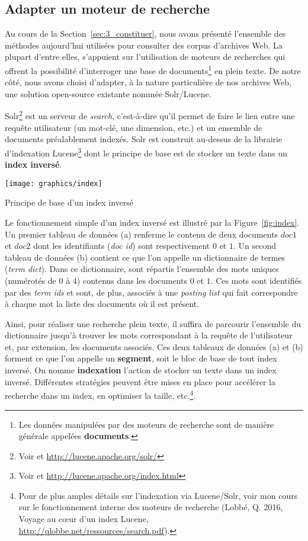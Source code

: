 \documentclass[symmetric,justified,marginals=raggedouter]{tufte-book}
\begin{document}
\subsection{Adapter un moteur de recherche}

\noindent Au cours de la Section~\ref{sec:3_constituer}, nous avons présenté l'ensemble des méthodes aujourd'hui utilisées pour consulter des corpus d'archives Web. La plupart d'entre elles, s'appuient sur l'utilisation de moteurs de recherches qui offrent la possibilité d'interroger une base de documents\footnote{\RaggedOuter Les données manipulées par des moteurs de recherche sont de manière générale appelées \textbf{documents}.} en plein texte. De notre côté, nous avons choisi d'adapter, à la nature particulière de nos archives Web, une solution open-source existante nommée Solr/Lucene. 

Solr\footnote{\RaggedOuter Voir \citep{grainger_solr_2014} et \url{http://lucene.apache.org/solr/}} est un serveur de \textit{search}, c'est-à-dire qu'il permet de faire le lien entre une requête utilisateur (un mot-clé, une dimension, etc.) et un ensemble de documents préalablement indexés. Solr est construit au-dessus de la librairie d'indexation Lucene\footnote{\RaggedOuter Voir \citep{hatcher_lucene_2004} et \url{http://lucene.apache.org/index.html}} dont le principe de base est de stocker un texte dans un \textbf{index inversé}.

\begin{marginfigure}%
  \texttt{[image: graphics/index]}
  \vspace*{0.2cm}  
  \caption{Principe de base d'un index inversé}
  \label{fig:index}
\end{marginfigure} 


Le fonctionnement simple d'un index inversé est illustré par la Figure~\ref{fig:index}. Un premier tableau de données (a) renferme le contenu de deux documents $doc 1$ et $doc 2$ dont les identifiants (\textit{doc id}) sont respectivement $0$ et $1$. Un second tableau de données (b) contient ce que l'on appelle un dictionnaire de termes (\textit{term dict}). Dans ce dictionnaire, sont répartis l'ensemble des mots uniques (numérotés de $0$ à $4$) contenus dans les documents $0$ et $1$. Ces mots sont identifiés par des \textit{term ids} et sont, de plus, associés à une \textit{posting list} qui fait correspondre à chaque mot la liste des documents où il est présent. 

Ainsi, pour réaliser une recherche plein texte, il suffira de parcourir l'ensemble du dictionnaire jusqu'à trouver les mots correspondant à la requête de l'utilisateur et, par extension, les documents associés. Ces deux tableaux de données (a) et (b) forment ce que l'on appelle un \textbf{segment}, soit le bloc de base de tout index inversé. On nomme \textbf{indexation} l'action de stocker un texte dans un index inversé. Différentes stratégies peuvent être mises en place pour accélérer la recherche dans un index, en optimiser la taille, etc.\footnote{\RaggedOuter Pour de plus amples détails sur l'indexation via Lucene/Solr, voir mon cours sur le fonctionnement interne des moteurs de recherche (Lobbé, Q. 2016, Voyage au cœur d'un index Lucene, \url{http://qlobbe.net/ressources/search.pdf}).}. 
\end{document}
